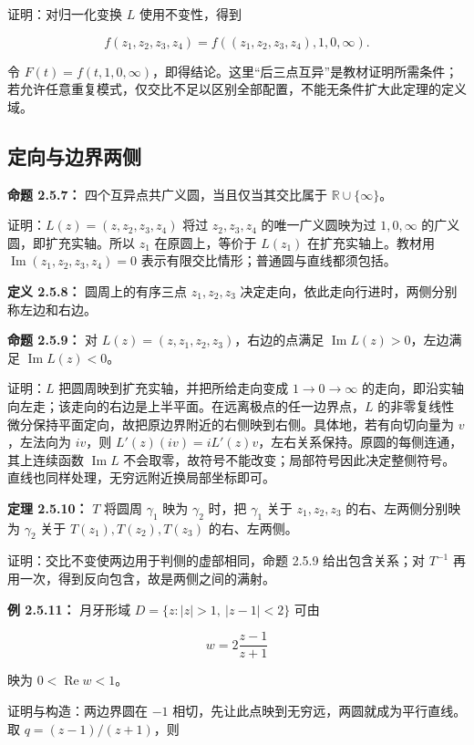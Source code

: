 \documentclass[11pt,a4paper]{article}
\begin{document}
证明：对归一化变换 \(L\) 使用不变性，得到

\[
f(z_1,z_2,z_3,z_4)=f((z_1,z_2,z_3,z_4),1,0,\infty).
\]

令
\(F(t)=f(t,1,0,\infty)\)，即得结论。这里``后三点互异''是教材证明所需条件；若允许任意重复模式，仅交比不足以区别全部配置，不能无条件扩大此定理的定义域。

\subsection{定向与边界两侧}\label{ch02-s5-ux5b9aux5411ux4e0eux8fb9ux754cux4e24ux4fa7}

\textbf{命题 2.5.7：} 四个互异点共广义圆，当且仅当其交比属于
\(\mathbb R\cup\{\infty\}\)。

证明：\(L(z)=(z,z_2,z_3,z_4)\) 将过 \(z_2,z_3,z_4\) 的唯一广义圆映为过
\(1,0,\infty\) 的广义圆，即扩充实轴。所以 \(z_1\) 在原圆上，等价于
\(L(z_1)\) 在扩充实轴上。教材用 \(\operatorname{Im}(z_1,z_2,z_3,z_4)=0\)
表示有限交比情形；普通圆与直线都须包括。

\textbf{定义 2.5.8：} 圆周上的有序三点 \(z_1,z_2,z_3\)
决定走向，依此走向行进时，两侧分别称左边和右边。

\textbf{命题 2.5.9：} 对 \(L(z)=(z,z_1,z_2,z_3)\)，右边的点满足
\(\operatorname{Im}L(z)>0\)，左边满足 \(\operatorname{Im}L(z)<0\)。

证明：\(L\) 把圆周映到扩充实轴，并把所给走向变成 \(1\to0\to\infty\)
的走向，即沿实轴向左走；该走向的右边是上半平面。在远离极点的任一边界点，\(L\)
的非零复线性微分保持平面定向，故把原边界附近的右侧映到右侧。具体地，若有向切向量为
\(v\)，左法向为 \(iv\)，则
\(L'(z)(iv)=iL'(z)v\)，左右关系保持。原圆的每侧连通，其上连续函数
\(\operatorname{Im}L\)
不会取零，故符号不能改变；局部符号因此决定整侧符号。直线也同样处理，无穷远附近换局部坐标即可。

\textbf{定理 2.5.10：} \(T\) 将圆周 \(\gamma_1\) 映为 \(\gamma_2\)
时，把 \(\gamma_1\) 关于 \(z_1,z_2,z_3\) 的右、左两侧分别映为
\(\gamma_2\) 关于 \(T(z_1),T(z_2),T(z_3)\) 的右、左两侧。

证明：交比不变使两边用于判侧的虚部相同，命题 2.5.9 给出包含关系；对
\(T^{-1}\) 再用一次，得到反向包含，故是两侧之间的满射。

\textbf{例 2.5.11：} 月牙形域 \(D=\{z:|z|>1,\ |z-1|<2\}\) 可由

\[
w=2\frac{z-1}{z+1}
\]

映为 \(0<\operatorname{Re}w<1\)。

证明与构造：两边界圆在 \(-1\)
相切，先让此点映到无穷远，两圆就成为平行直线。取 \(q=(z-1)/(z+1)\)，则
\end{document}

